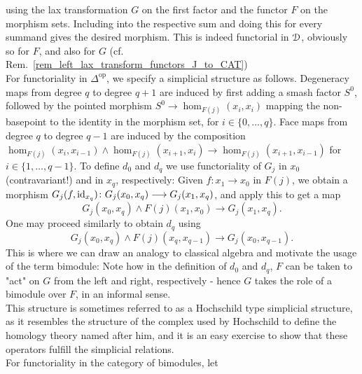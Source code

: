 \begin{defn}
\begin{displaymath}
      \end{displaymath}
      using the lax transformation $G$ on the first factor and the functor $F$
      on the morphism sets.
      Including into the respective sum and doing this for every summand gives
      the desired morphism. This is indeed functorial in $\mathcal{D}$, obviously so for
      $F$, and also for $G$ (cf.
      Rem.~\ref{rem_left_lax_transform_functors_J_to_CAT})\\
      For functoriality in $\Delta^{\mathrm{op}}$, we specify a simplicial
      structure as follows.
      Degeneracy maps from degree $q$ to degree $q+1$ are induced by first
      adding a smash factor $S^0$, followed by the pointed morphism $S^0 \to
      \hom_{F(j)}(x_i,x_i)$ mapping the non-basepoint to the identity in the
      morphism set, for $i \in \{ 0, \ldots, q \}$.  Face maps from degree $q$
      to degree $q-1$ are induced by the composition $\hom_{F(j)}(x_i,x_{i-1})
      \wedge \hom_{F(j)}(x_{i+1},x_i) \to \hom_{F(j)}(x_{i+1},x_{i-1})$ for $i
      \in \{ 1, \ldots, q-1 \}$.  To define $d_0$ and $d_q$ we use functoriality
      of $G_j$ in $x_0$ (contravariant!) and in $x_q$, respectively: Given $f:
      x_1 \to x_0$ in $F(j)$, we obtain a morphism $G_j(f,\operatorname{id}_{x_q}) \colon
      G_j(x_0,x_q) \longrightarrow G_j(x_1,x_q)$, and apply this to get a map
      \begin{displaymath}
        G_j(x_0,x_q) \wedge F(j)(x_1,x_0) \to G_j(x_1,x_q).
      \end{displaymath}
      One may proceed similarly to obtain $d_q$ using
      \begin{displaymath}
        G_j(x_0,x_q) \wedge F(j)(x_q,x_{q-1}) \to G_j(x_0,x_{q-1}).
      \end{displaymath}
      This is where we can draw an analogy to classical algebra and motivate the
      usage of the term bimodule: Note how in the definition of $d_0$ and $d_q$,
      $F$ can be taken to "act" on $G$ from the left and right, respectively -
      hence $G$ takes the role of a bimodule over $F$, in an informal sense.\\
      This structure is sometimes referred to as a Hochschild type simplicial
      structure, as it resembles the structure of the complex used by Hochschild
      to define the homology theory named after him, and it is an easy exercise
      to show that these operators fulfill the simplicial relations.\\
      For functoriality in the category of bimodules, let
      \begin{displaymath}

\end{displaymath}
\end{defn}
